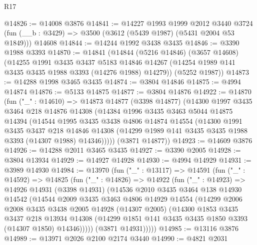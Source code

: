 \begin{lexlean}{R17}
\begin{coremodule}
@14826 := @14008 @3876
@14841 := @14227
    @1993
    @1999
    @2012
    @3440
    @3724
    (fun (__b : @3429) => @3500 (@3612 (@5439 @1987) (@5431 @2004 @53 @1849)))
    @14608
@14844 := @14244 @1992 @3438 @3435
@14846 := @3390 @1988 @3393
@14870 := @14841
    (@14844
      (@5216 @14846)
      (@3657 @14608)
      (@14255
        @1991
        @3435
        @3437
        @5183
        @14846
        @14267
        (@14254 @1989 @141 @3435 @3435 @1988 @3393 (@14276 @1988) @14279))
      (@5252 @1987))
@14873 := @14288 @1998 @3465 @3435
@14874 := @3804 @14846
@14875 := @4994 @14874
@14876 := @5133 @14875
@14877 := @3804 @14876
@14922 := @14870
    (fun ("_" : @14610) =>
    @14873
      @14877
      (@3398 @14877)
      (@14300
        @1997
        @3435
        @3464
        @218
        @14876
        @14308
        (@14384
          @1996
          @3435
          @3463
          @5044
          @14875
          @14394
          (@14544
            @1995
            @3435
            @3438
            @4806
            @14874
            @14554
            (@14300
              @1991
              @3435
              @3437
              @218
              @14846
              @14308
              (@14299 @1989 @141 @3435 @3435 @1988 @3393 (@14307 @1988) @14346)))))
      (@3871 @14877))
@14923 := @14609 @3876
@14926 := @14288 @2011 @3465 @3435
@14927 := @3390 @2005
@14928 := @3804 @13934
@14929 := @14927 @14928
@14930 := @4994 @14929
@14931 := @3989 @14930
@14984 := @13970
    (fun ("_" : @13117) =>
    @14591
      (fun ("_" : @14592) =>
      @14825
        (fun ("_" : @14826) =>
        @14922
          (fun ("_" : @14923) =>
          @14926
            @14931
            (@3398 @14931)
            (@14536
              @2010
              @3435
              @3464
              @138
              @14930
              @14542
              (@14544
                @2009
                @3435
                @3463
                @4806
                @14929
                @14554
                (@14299
                  @2006
                  @2008
                  @3435
                  @3438
                  @2005
                  @14928
                  (@14307 @2005)
                  (@14300
                    @1853
                    @3435
                    @3437
                    @218
                    @13934
                    @14308
                    (@14299 @1851 @141 @3435 @3435 @1850 @3393 (@14307 @1850) @14346)))))
            (@3871 @14931)))))
@14985 := @13116 @3876
@14989 := @13971 @2026 @2100 @2174 @3440
@14990 := @4821 @2031

\end{coremodule}
\end{lexlean}
